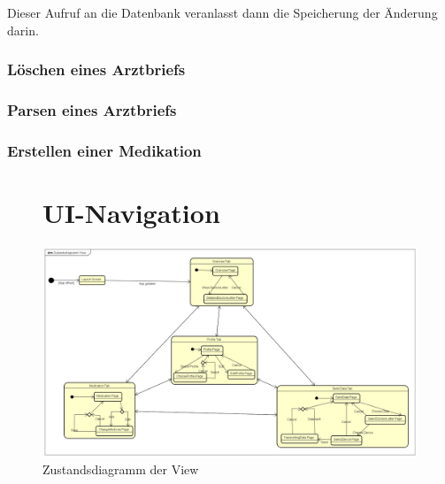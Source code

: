 \documentclass[a4paper]{scrreprt}
\begin{document}
Dieser Aufruf an die Datenbank veranlasst dann die Speicherung der Änderung darin.

\subsubsection{Löschen eines Arztbriefs}
\subsubsection{Parsen eines Arztbriefs}
\subsubsection{Erstellen einer Medikation}

\newpage
\begin{figure}
\section{UI-Navigation}
\centering
\includegraphics[width=0.9\textheight, angle=90]{graphics/Zustandsdiagramm_View}
\caption{Zustandsdiagramm der View}
\end{figure}
\end{document}
